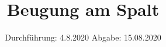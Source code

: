 

\subject{406}
\title{Beugung am Spalt}
\date{%
  Durchführung: 4.8.2020
  \hspace{3em}
  Abgabe: 15.08.2020
}



\maketitle
\thispagestyle{empty}
\tableofcontents
\newpage







\printbibliography{}


